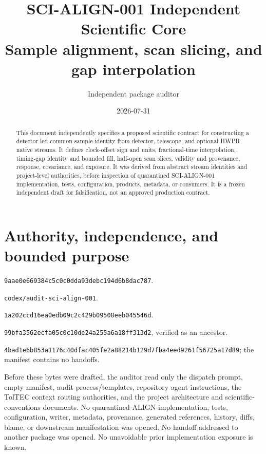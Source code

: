 \documentclass[11pt]{article}
\title{SCI-ALIGN-001 Independent Scientific Core\\
\large Sample alignment, scan slicing, and gap interpolation}
\author{Independent package auditor}
\date{2026-07-31}
\newcommand{\code}[1]{\nolinkurl{#1}}
\begin{document}
\maketitle

\begin{abstract}
This document independently specifies a proposed scientific contract for
constructing a detector-led common sample identity from detector, telescope,
and optional HWPR native streams.  It defines clock-offset sign and units,
fractional-time interpolation, timing-gap identity and bounded fill, half-open
scan slices, validity and provenance, response, covariance, and exposure.  It
was derived from abstract stream identities and project-level authorities,
before inspection of quarantined SCI-ALIGN-001 implementation, tests,
configuration, products, metadata, or consumers.  It is a frozen independent
draft for falsification, not an approved production contract.
\end{abstract}

\section{Authority, independence, and bounded purpose}

\begin{description}[style=multiline,leftmargin=0.28\linewidth,labelwidth=0.25\linewidth]
\raggedright
\item[Governing source] {\small\code{9aae0e669384c5c0c0dda93debc194d6b8dac787}}.
\item[Dedicated branch] {\small\code{codex/audit-sci-align-001}}.
\item[Frozen dispatch] {\small\code{1a202ccd16ea0edb09c2c429b09508eeb045546d}}.
\item[Registry snapshot] {\small\code{99bfa3562ecfa05c0c10de24a255a6a18ff313d2}}, verified as an ancestor.
\item[Manifest SHA-256] {\small\code{4bad1e6b853a1176c40dfac405fe2a88214b129d7fba4eed9261f56725a17d89}}; the manifest contains no handoffs.
\end{description}

Before these bytes were drafted, the auditor read only the dispatch prompt,
empty manifest, audit process/templates, repository agent instructions, the
TolTEC context routing authorities, and the project architecture and
scientific-conventions documents.  No quarantined ALIGN implementation,
tests, configuration, writer, metadata, provenance, generated references,
history, diffs, blame, or downstream manifestation was opened.  No handoff
addressed to another package was opened.  No unavoidable prior implementation
exposure is known.
\end{document}
